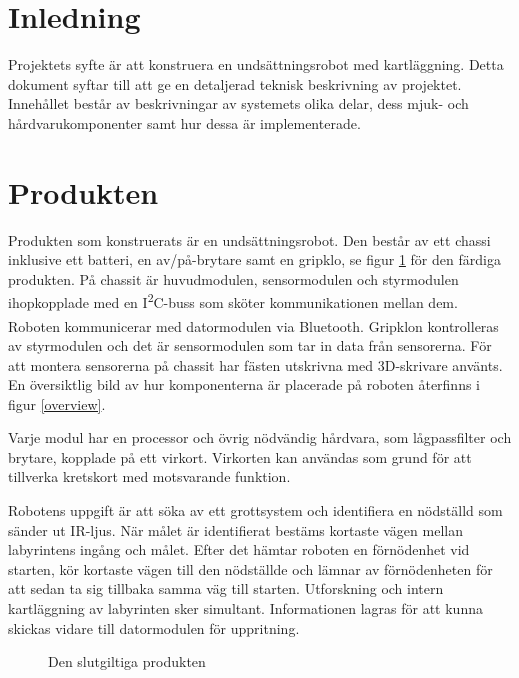 \documentclass[11pt]{article}
\begin{document}
\begin{flushleft}
\section{Inledning}

Projektets syfte är att konstruera en undsättningsrobot med kartläggning. Detta dokument syftar till att ge en detaljerad teknisk beskrivning av projektet. Innehållet består av beskrivningar av systemets olika delar, dess mjuk- och hårdvarukomponenter samt hur dessa är implementerade.

\section{Produkten}
Produkten som konstruerats är en undsättningsrobot. Den består av ett chassi inklusive ett batteri, en av/på-brytare samt en gripklo, se figur \ref{endProduct} för den färdiga produkten. På chassit är huvudmodulen, sensormodulen och styrmodulen ihopkopplade med en I\textsuperscript{2}C-buss som sköter kommunikationen mellan dem. Roboten kommunicerar med datormodulen via Bluetooth\textsuperscript{\circledR}. Gripklon kontrolleras av styrmodulen och  det är sensormodulen som tar in data från sensorerna. För att montera sensorerna på chassit har fästen utskrivna med 3D-skrivare använts. En översiktlig bild av hur komponenterna är placerade på roboten återfinns i figur \ref{overview}.

Varje modul har en processor och övrig nödvändig hårdvara, som lågpassfilter och brytare, kopplade på ett virkort. Virkorten kan användas som grund för att tillverka kretskort med motsvarande funktion. 

Robotens uppgift är att söka av ett grottsystem och identifiera en nödställd som sänder ut IR-ljus. När målet är identifierat bestäms kortaste vägen mellan labyrintens ingång och målet. Efter det hämtar roboten en förnödenhet vid starten, kör kortaste vägen till den nödställde och lämnar av förnödenheten för att sedan ta sig tillbaka samma väg till starten. Utforskning och intern kartläggning av labyrinten sker simultant. Informationen lagras för att kunna skickas vidare till datormodulen för uppritning. 

\begin{figure}[!htbp]
\centering
\noindent{}
\caption{Den slutgiltiga produkten \label{endProduct}}
\end{figure}


\end{flushleft}
\end{document}
